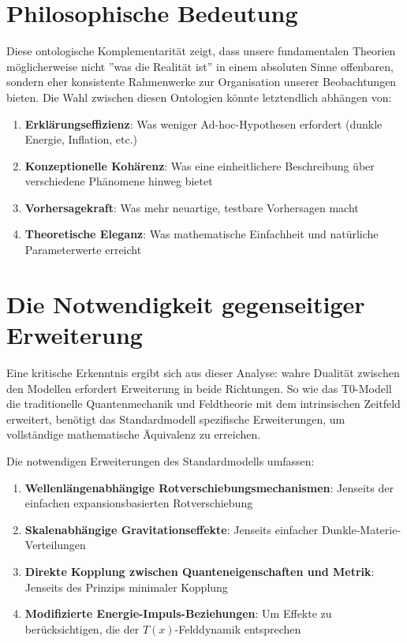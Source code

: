 \documentclass[12pt,a4paper]{article}
\newcommand{\Tfield}{T(x)}
\begin{document}
	\section{Philosophische Bedeutung}
	
	Diese ontologische Komplementarität zeigt, dass unsere fundamentalen Theorien möglicherweise nicht ''was die Realität ist'' in einem absoluten Sinne offenbaren, sondern eher konsistente Rahmenwerke zur Organisation unserer Beobachtungen bieten. Die Wahl zwischen diesen Ontologien könnte letztendlich abhängen von:
	
	\begin{enumerate}
		\item \textbf{Erklärungseffizienz}: Was weniger Ad-hoc-Hypothesen erfordert (dunkle Energie, Inflation, etc.)
		\item \textbf{Konzeptionelle Kohärenz}: Was eine einheitlichere Beschreibung über verschiedene Phänomene hinweg bietet
		\item \textbf{Vorhersagekraft}: Was mehr neuartige, testbare Vorhersagen macht
		\item \textbf{Theoretische Eleganz}: Was mathematische Einfachheit und natürliche Parameterwerte erreicht
	\end{enumerate}
	
	\section{Die Notwendigkeit gegenseitiger Erweiterung}
	
	Eine kritische Erkenntnis ergibt sich aus dieser Analyse: wahre Dualität zwischen den Modellen erfordert Erweiterung in beide Richtungen. So wie das T0-Modell die traditionelle Quantenmechanik und Feldtheorie mit dem intrinsischen Zeitfeld erweitert, benötigt das Standardmodell spezifische Erweiterungen, um vollständige mathematische Äquivalenz zu erreichen.
	
	Die notwendigen Erweiterungen des Standardmodells umfassen:
	
	\begin{enumerate}
		\item \textbf{Wellenlängenabhängige Rotverschiebungsmechanismen}: Jenseits der einfachen expansionsbasierten Rotverschiebung
		\item \textbf{Skalenabhängige Gravitationseffekte}: Jenseits einfacher Dunkle-Materie-Verteilungen
		\item \textbf{Direkte Kopplung zwischen Quanteneigenschaften und Metrik}: Jenseits des Prinzips minimaler Kopplung
		\item \textbf{Modifizierte Energie-Impuls-Beziehungen}: Um Effekte zu berücksichtigen, die der $\Tfield$-Felddynamik entsprechen
	\end{enumerate}
	
\end{document}
